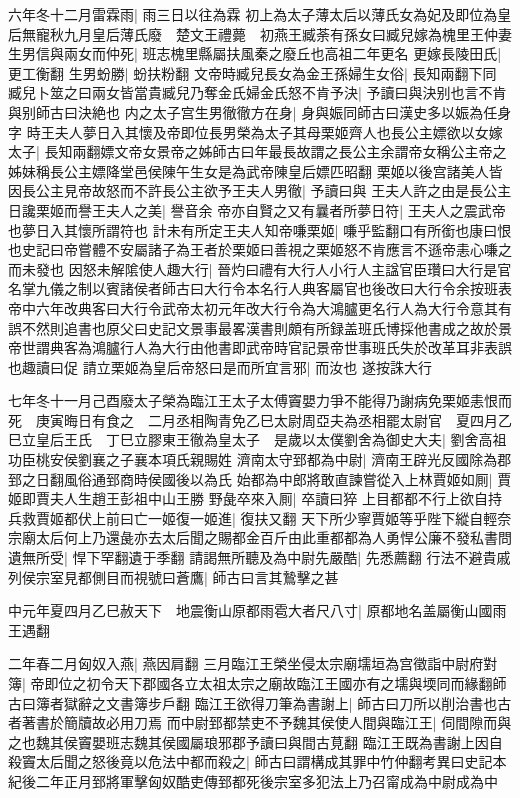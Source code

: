 六年冬十二月雷霖雨|{
	雨三日以往為霖}
初上為太子薄太后以薄氏女為妃及即位為皇后無寵秋九月皇后薄氏廢　楚文王禮薨　初燕王臧荼有孫女曰臧兒嫁為槐里王仲妻生男信與兩女而仲死|{
	班志槐里縣屬扶風秦之廢丘也高祖二年更名}
更嫁長陵田氏|{
	更工衡翻}
生男蚡勝|{
	蚡扶粉翻}
文帝時臧兒長女為金王孫婦生女俗|{
	長知兩翻下同}
臧兒卜筮之曰兩女皆當貴臧兒乃奪金氏婦金氏怒不肯予決|{
	予讀曰與決别也言不肯與别師古曰決絶也}
内之太子宫生男徹徹方在身|{
	身與娠同師古曰漢史多以娠為任身字}
時王夫人夢日入其懷及帝即位長男榮為太子其母栗姬齊人也長公主嫖欲以女嫁太子|{
	長知兩翻嫖文帝女景帝之姊師古曰年最長故謂之長公主余謂帝女稱公主帝之姊妹稱長公主嫖降堂邑侯陳午生女是為武帝陳皇后嫖匹昭翻}
栗姬以後宫諸美人皆因長公主見帝故怒而不許長公主欲予王夫人男徹|{
	予讀曰與}
王夫人許之由是長公主日讒栗姬而譽王夫人之美|{
	譽音余}
帝亦自賢之又有曩者所夢日符|{
	王夫人之震武帝也夢日入其懷所謂符也}
計未有所定王夫人知帝嗛栗姬|{
	嗛乎監翻口有所銜也康曰恨也史記曰帝嘗體不安屬諸子為王者於栗姬曰善視之栗姬怒不肯應言不遜帝恚心嗛之而未發也}
因怒未解隂使人趣大行|{
	晉灼曰禮有大行人小行人主諡官臣瓚曰大行是官名掌九儀之制以賓諸侯者師古曰大行令本名行人典客屬官也後改曰大行令余按班表帝中六年改典客曰大行令武帝太初元年改大行令為大鴻臚更名行人為大行令意其有誤不然則追書也原父曰史記文景事最畧漢書則頗有所録盖班氏博採他書成之故於景帝世謂典客為鴻臚行人為大行由他書即武帝時官記景帝世事班氏失於改革耳非表誤也趣讀曰促}
請立栗姬為皇后帝怒曰是而所宜言邪|{
	而汝也}
遂按誅大行

七年冬十一月己酉廢太子榮為臨江王太子太傅竇嬰力爭不能得乃謝病免栗姬恚恨而死　庚寅晦日有食之　二月丞相陶青免乙巳太尉周亞夫為丞相罷太尉官　夏四月乙巳立皇后王氏　丁巳立膠東王徹為皇太子　是歲以太僕劉舍為御史大夫|{
	劉舍高祖功臣桃安侯劉襄之子襄本項氏親賜姓}
濟南太守郅都為中尉|{
	濟南王辟光反國除為郡郅之日翻風俗通郅商時侯國後以為氏}
始都為中郎將敢直諫嘗從入上林賈姬如厠|{
	賈姬即賈夫人生趙王彭祖中山王勝}
野彘卒來入厠|{
	卒讀曰猝}
上目都都不行上欲自持兵救賈姬都伏上前曰亡一姬復一姬進|{
	復扶又翻}
天下所少寧賈姬等乎陛下縱自輕奈宗廟太后何上乃還彘亦去太后聞之賜都金百斤由此重都都為人勇悍公廉不發私書問遺無所受|{
	悍下罕翻遺于季翻}
請謁無所聽及為中尉先嚴酷|{
	先悉薦翻}
行法不避貴戚列侯宗室見都側目而視號曰蒼鷹|{
	師古曰言其鷙擊之甚}


中元年夏四月乙巳赦天下　地震衡山原都雨雹大者尺八寸|{
	原都地名盖屬衡山國雨王遇翻}


二年春二月匈奴入燕|{
	燕因肩翻}
三月臨江王榮坐侵太宗廟壖垣為宫徵詣中尉府對簿|{
	帝即位之初令天下郡國各立太祖太宗之廟故臨江王國亦有之壖與堧同而緣翻師古曰簿者獄辭之文書簿步戶翻}
臨江王欲得刀筆為書謝上|{
	師古曰刀所以削治書也古者著書於簡牘故必用刀焉}
而中尉郅都禁吏不予魏其侯使人間與臨江王|{
	伺間隙而與之也魏其侯竇嬰班志魏其侯國屬琅邪郡予讀曰與間古莧翻}
臨江王既為書謝上因自殺竇太后聞之怒後竟以危法中都而殺之|{
	師古曰謂構成其罪中竹仲翻考異曰史記本紀後二年正月郅將軍擊匈奴酷吏傳郅都死後宗室多犯法上乃召甯成為中尉成為中}


